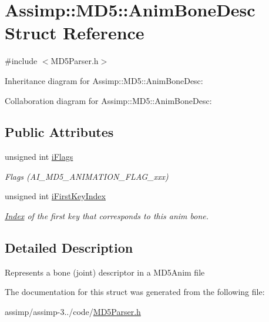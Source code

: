 \hypertarget{struct_assimp_1_1_m_d5_1_1_anim_bone_desc}{\section{Assimp\+:\+:M\+D5\+:\+:Anim\+Bone\+Desc Struct Reference}
\label{struct_assimp_1_1_m_d5_1_1_anim_bone_desc}
}


{\ttfamily \#include $<$M\+D5\+Parser.\+h$>$}



Inheritance diagram for Assimp\+:\+:M\+D5\+:\+:Anim\+Bone\+Desc\+:


Collaboration diagram for Assimp\+:\+:M\+D5\+:\+:Anim\+Bone\+Desc\+:
\subsection*{Public Attributes}
\begin{DoxyCompactItemize}
\item 
\hypertarget{struct_assimp_1_1_m_d5_1_1_anim_bone_desc_a8c791c24c56de85983462c2ab3eae7be}{unsigned int \hyperlink{struct_assimp_1_1_m_d5_1_1_anim_bone_desc_a8c791c24c56de85983462c2ab3eae7be}{i\+Flags}}\label{struct_assimp_1_1_m_d5_1_1_anim_bone_desc_a8c791c24c56de85983462c2ab3eae7be}

\begin{DoxyCompactList}\small\item\em Flags (A\+I\+\_\+\+M\+D5\+\_\+\+A\+N\+I\+M\+A\+T\+I\+O\+N\+\_\+\+F\+L\+A\+G\+\_\+xxx) \end{DoxyCompactList}\item 
\hypertarget{struct_assimp_1_1_m_d5_1_1_anim_bone_desc_ae5771bf44fac2b6a20db065e5b365f47}{unsigned int \hyperlink{struct_assimp_1_1_m_d5_1_1_anim_bone_desc_ae5771bf44fac2b6a20db065e5b365f47}{i\+First\+Key\+Index}}\label{struct_assimp_1_1_m_d5_1_1_anim_bone_desc_ae5771bf44fac2b6a20db065e5b365f47}

\begin{DoxyCompactList}\small\item\em \hyperlink{struct_index}{Index} of the first key that corresponds to this anim bone. \end{DoxyCompactList}\end{DoxyCompactItemize}


\subsection{Detailed Description}
Represents a bone (joint) descriptor in a M\+D5\+Anim file 

The documentation for this struct was generated from the following file\+:\begin{DoxyCompactItemize}
\item 
assimp/assimp-\/3../code/\hyperlink{_m_d5_parser_8h}{M\+D5\+Parser.\+h}\end{DoxyCompactItemize}
